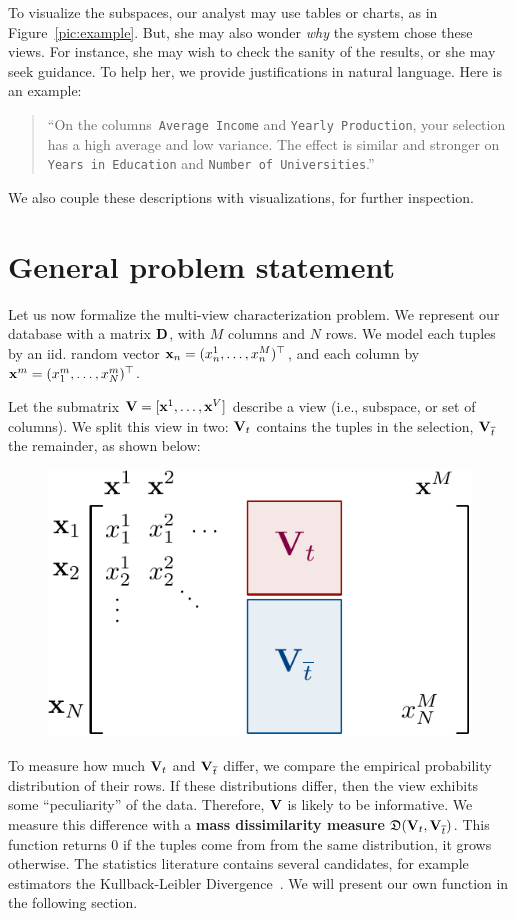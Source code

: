 To visualize the subspaces, our analyst may use tables or charts, as in
Figure~\ref{pic:example}. But, she may also wonder \emph{why} the system chose
these views. For instance, she may wish to check the sanity of the results, or
she may seek guidance.  To help her, we provide justifications in natural
language.  Here is an example:
\begin{quotation}
    ``On the columns~\texttt{Average Income} and \texttt{Year\-ly Production},
    your selection has a high average and low variance. The effect is similar
    and stronger on \texttt{Years in Education} and \texttt{Number of
    Universities}.''
\end{quotation}
We also couple these descriptions with visualizations, for further
inspection. 


\section{General problem statement}
\label{sec:problem}
Let us now formalize the multi-view characterization prob\-lem. We represent our
database with a matrix $\mathbf{D}$, with $M$ columns and $N$ rows.  We model 
each tuples by an iid. random vector  $\mathbf{x}_n = (x^1_n, \dots, x^M_n)^\top$,
and each column by  $\mathbf{x}^{m}= (x^m_1, \dots, x^m_N)^\top$.

Let the submatrix $\mathbf{V}  = [\mathbf{x}^1, \dots, \mathbf{x}^V]$ describe a view
(i.e., subspace, or set of columns). We split this view in two:  ${\mathbf{V}}_t$
contains the tuples in the selection, ${\mathbf{V}}_{\overline{t}}$ the remainder,
as shown below:
\begin{figure}[h!]
  \centering
  \includegraphics[width=0.6\columnwidth]{Figures/Notations}
  \label{pic:notations}
\end{figure}


To measure how much $\mathbf{V}_t$ and ${\mathbf{V}}_{\overline{t}}$ differ, we compare
the empirical probability distribution of their rows. If these distributions
differ, then the view exhibits some ``peculiarity'' of the data.  Therefore,
$\mathbf{V}$ is likely to be informative. We measure this difference with a
\textbf{mass dissimilarity measure} $\mathfrak{D}(\mathbf{V}_t, \mathbf{V}_{\overline{t}})$.  This
function returns 0 if the tuples come from from the same distribution, it grows
otherwise. The statistics literature contains several candidates, for example
estimators the Kullback-Leibler Divergence~\cite{wasserman2013all}. We will
present our own function in the following section.

